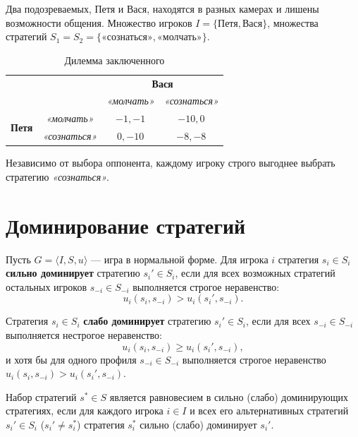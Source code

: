 \begin{example}
Два подозреваемых, Петя и Вася, находятся в разных камерах и лишены возможности общения. Множество игроков $I = \{\text{Петя}, \text{Вася}\}$, множества стратегий $S_1 = S_2 = \{\text{«сознаться»}, \text{«молчать»}\}$.

\begin{table}[h]
\centering
\renewcommand{\arraystretch}{1.3}
\begin{NiceTabular}{cc|cc}
\toprule
& &  \\
& & \textit{«молчать»} & \textit{«сознаться»} \\
\midrule
{} 
& \textit{«молчать»} & $-1, -1$ & $-10, 0$ \\
& \textit{«сознаться»} & $0, -10$ & $-8, -8$ \\
\bottomrule
\end{NiceTabular}
\caption{Дилемма заключенного}
\end{table}
Независимо от выбора оппонента, каждому игроку строго выгоднее выбрать стратегию \textit{«сознаться»}.
\end{example}

\section{Доминирование стратегий}

\begin{definition}
Пусть $G = \langle I, S, u \rangle$ — игра в нормальной форме. Для игрока $i$ стратегия $s_i \in S_i$ \textbf{сильно доминирует} стратегию $s_i' \in S_i$, если для всех возможных стратегий остальных игроков $s_{-i} \in S_{-i}$ выполняется строгое неравенство:
\begin{equation}
    u_i(s_i, s_{-i}) > u_i(s_i', s_{-i}).
\end{equation}

Стратегия $s_i \in S_i$ \textbf{слабо доминирует} стратегию $s_i' \in S_i$, если для всех $s_{-i} \in S_{-i}$ выполняется нестрогое неравенство:
\begin{equation}
    u_i(s_i, s_{-i}) \ge u_i(s_i', s_{-i}),
\end{equation}
и хотя бы для одного профиля $s_{-i} \in S_{-i}$ выполняется строгое неравенство $u_i(s_i, s_{-i}) > u_i(s_i', s_{-i})$.
\end{definition}

\begin{definition}
Набор стратегий $s^* \in S$ является равновесием в сильно (слабо) доминирующих стратегиях, если для каждого игрока $i \in I$ и всех его альтернативных стратегий $s_i' \in S_i$ ($s_i' \neq s_i^*$) стратегия $s_i^*$ сильно (слабо) доминирует $s_i'$.
\end{definition}


